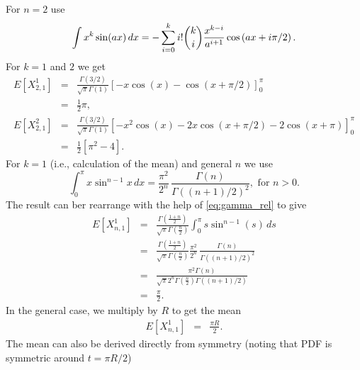 \noindent 
For $n=2$ use \cite[2.633,1.(p.183)]{GandR}
\begin{equation}
  \label{eq:x^n_sin}
  \int x^k \sin(ax) \, dx = - \sum_{i=0}^{k} i! \dbinom{k}{i}
                               \frac{x^{k-i}}{a^{i+1}}
                               \cos\left( ax + i \pi/2 \right).
\end{equation}
For $k=1$ and $2$ we get
\begin{eqnarray}
 E[X_{2,1}^1]
      & = & \frac{\Gamma\left(3/2\right) }
                 {\sqrt{\pi } \Gamma\left(1\right)}
            \left[ -x \cos(x) - \cos(x + \pi/2) \right]_0^{\pi}  \nonumber \\
      & = &  \frac{1}
                 {2}
            \pi,             
             \label{eq:starting_n=1}         \\
 E[X_{2,1}^2] 
      & = & \frac{\Gamma\left(3/2\right) }
                 {\sqrt{\pi } \Gamma\left(1\right)}
            \left[- x^2 \cos(x) - 2 x \cos(x + \pi/2) - 2 \cos(x + \pi) \right]_0^{\pi} \nonumber  \\
      & = & \frac{1}
                 {2}
            \left[ \pi^2  - 4 \right]. 
            \label{eq:starting_n=2}
\end{eqnarray}
For $k=1$ (i.e., calculation of the mean) and general $n$ we use \cite[3.821,1.(p.446)]{GandR}
\begin{equation}
  \label{eq:sin_x_x}
  \int_0^\pi x \sin^{n-1} x \, dx =
       \frac{\pi^2}{2^{n}} \, \frac{\Gamma(n)}{ \Gamma\left((n+1)/2 \right)^2 }, \mbox{ for } n>0.
\end{equation}
The result can ber rearrange with the help of \eqref{eq:gamma_rel} to give
\begin{eqnarray}
 E[X_{n,1}^1]
      & = & \frac{\Gamma\left(\frac{1+n}{2}\right) }
                 {\sqrt{\pi } \Gamma\left(\frac{n}{2}\right)}
            \int_0^{\pi} 
                    s  \sin^{n-1}(s)
                   \, ds \nonumber \\
      & = & \frac{\Gamma\left(\frac{1+n}{2}\right) }
                 {\sqrt{\pi } \Gamma\left(\frac{n}{2}\right)}
              \frac{\pi^2}{2^{n}} \, \frac{\Gamma(n)}{ \Gamma\left((n+1)/2 \right)^2 }
            \nonumber \\
      & = & \frac{\pi^2 \Gamma(n)}
                 {\sqrt{\pi} 2^{n} \Gamma\left(\frac{n}{2}\right) \Gamma\left((n+1)/2 \right)}
            \nonumber \\
      & = & \frac{\pi}{2}.
\end{eqnarray}
In the general case, we multiply by $R$ to get the mean
\begin{eqnarray}
  \label{eq:mean_nsphere_geo}
 E[X_{n,1}^1] & = &  \frac{\pi R}{2}.
\end{eqnarray}
The mean can also be derived directly from symmetry (noting that PDF
is symmetric around $t = \pi R/2$)



